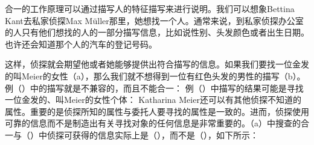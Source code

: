 合一的工作原理可以通过描写人的特征描写来进行说明。我们可以想象Bettina Kant去私家侦探Max Müller那里，她想找一个人。通常来说，到私家侦探办公室的人只有他们想找的人的一部分描写信息，比如说性别、头发颜色或者出生日期。也许还会知道那个人的汽车的登记号码。

这样，侦探就会期望他或者她能够提供出符合描写的信息。如果我们要找一位金发的叫Meier的女性（a），那么我们就不想得到一位有红色头发的男性的描写（b）。例（）中的描写就是不兼容的，而且不能合一：
\eal
\ex\label{ex-meier-female-blonde}
\ex {}
\zl
例（）中描写的结果可能是寻找一位金发的、叫Meier的女性个体：
\ea
\label{info-detective}
\z
Katharina Meier还可以有其他侦探不知道的属性。重要的是侦探所知的属性与委托人要寻找的属性是一致的。进而，侦探使用可靠的信息而不是制造出有关寻找对象的任何信息是非常重要的。（a）中搜查的合一与（）中侦探可获得的信息实际上是（），而不是（），如下所示：
